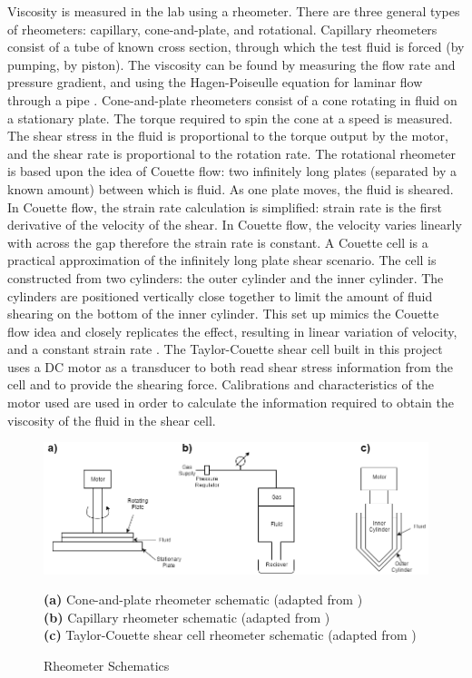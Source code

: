 \documentclass[twoside,a4]{report}
\def\br{\newline \newline \noindent}
\begin{document}
	\noindent
	Viscosity is measured in the lab using a rheometer. There are three general types of rheometers: capillary, cone-and-plate, and rotational. Capillary rheometers consist of a tube of known cross section, through which the test fluid is forced (by pumping, by piston). The viscosity can be found by measuring the flow rate and pressure gradient, and using the Hagen-Poiseulle equation for laminar flow through a pipe \cite{backcaprheom}. Cone-and-plate rheometers consist of a cone rotating in fluid on a stationary plate. The torque required to spin the cone at a speed is measured. The shear stress in the fluid is proportional to the torque output by the motor, and the shear rate is proportional to the rotation rate. 
	\br
	The rotational rheometer is based upon the idea of Couette flow: two infinitely long plates (separated by a known amount) between which is fluid. As one plate moves, the fluid is sheared. In Couette flow, the strain rate calculation is simplified: strain rate is the first derivative of the velocity of the shear. In Couette flow, the velocity varies linearly with across the gap therefore the strain rate is constant. A Couette cell is a practical approximation of the infinitely long plate shear scenario. The cell is constructed from two cylinders: the outer cylinder and the inner cylinder. The cylinders are positioned vertically close together to limit the amount of fluid shearing on the bottom of the inner cylinder. This set up mimics the Couette flow idea and closely replicates the effect, resulting in linear variation of velocity, and a constant strain rate \cite{couetteshearcell}.
	\br
	The Taylor-Couette shear cell built in this project uses a DC motor as a transducer to both read shear stress information from the cell and to provide the shearing force. Calibrations and characteristics of the motor used are used in order to calculate the information required to obtain the viscosity of the fluid in the shear cell.
	\begin{figure}[!htb]
		\centering
		\includegraphics[scale=0.45]{images/capschem.png}
		\caption{Rheometer Schematics}
		\label{figrheomschem}
		\footnotesize 
		\textbf{(a)} Cone-and-plate rheometer schematic (adapted from \cite{tadhrbrochure})\\
		\textbf{(b)} Capillary rheometer schematic (adapted from \cite{figcapschem})\\
		\textbf{(c)} Taylor-Couette shear cell rheometer schematic (adapted from \cite{couetteshearcell})
	\end{figure}
	
\end{document}
